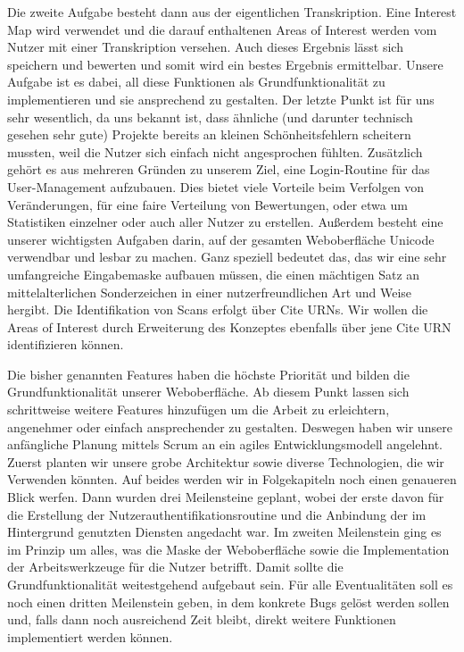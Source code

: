 \documentclass{article}
\begin{document}
Die zweite Aufgabe besteht dann aus der eigentlichen Transkription.
Eine Interest Map wird verwendet und die darauf enthaltenen Areas of Interest werden vom Nutzer mit einer Transkription versehen.
Auch dieses Ergebnis lässt sich speichern und bewerten und somit wird ein bestes Ergebnis ermittelbar.
Unsere Aufgabe ist es dabei, all diese Funktionen als Grundfunktionalität zu implementieren und sie ansprechend zu gestalten.
Der letzte Punkt ist für uns sehr wesentlich, da uns bekannt ist, dass ähnliche (und darunter technisch gesehen sehr gute)
Projekte bereits an kleinen Schönheitsfehlern scheitern mussten, weil die Nutzer sich einfach nicht angesprochen fühlten.
Zusätzlich gehört es aus mehreren Gründen zu unserem Ziel, eine Login-Routine für das User-Management aufzubauen.
Dies bietet viele Vorteile beim Verfolgen von Veränderungen, für eine faire Verteilung von Bewertungen,
oder etwa um Statistiken einzelner oder auch aller Nutzer zu erstellen.
Außerdem besteht eine unserer wichtigsten Aufgaben darin, auf der gesamten Weboberfläche Unicode verwendbar und lesbar zu machen.
Ganz speziell bedeutet das, das wir eine sehr umfangreiche Eingabemaske aufbauen müssen,
die einen mächtigen Satz an mittelalterlichen Sonderzeichen in einer nutzerfreundlichen Art und Weise hergibt.
Die Identifikation von Scans erfolgt über Cite URNs.%
Wir wollen die Areas of Interest durch Erweiterung des Konzeptes ebenfalls über jene Cite URN identifizieren können.%

Die bisher genannten Features haben die höchste Priorität und bilden die Grundfunktionalität unserer Weboberfläche.
Ab diesem Punkt lassen sich schrittweise weitere Features hinzufügen um die Arbeit zu erleichtern, angenehmer oder einfach ansprechender zu gestalten.
Deswegen haben wir unsere anfängliche Planung mittels Scrum an ein agiles Entwicklungsmodell angelehnt.
Zuerst planten wir unsere grobe Architektur sowie diverse Technologien, die wir Verwenden könnten.
Auf beides werden wir in Folgekapiteln noch einen genaueren Blick werfen. Dann wurden drei Meilensteine geplant,
wobei der erste davon für die Erstellung der Nutzerauthentifikationsroutine und die Anbindung der im Hintergrund genutzten Diensten angedacht war.
Im zweiten Meilenstein ging es im Prinzip um alles, was die Maske der Weboberfläche sowie die Implementation der Arbeitswerkzeuge für die Nutzer betrifft.
Damit sollte die Grundfunktionalität weitestgehend aufgebaut sein. Für alle Eventualitäten soll es noch einen dritten Meilenstein geben,
in dem konkrete Bugs gelöst werden sollen und, falls dann noch ausreichend Zeit bleibt, direkt weitere Funktionen implementiert werden können.
\end{document}
